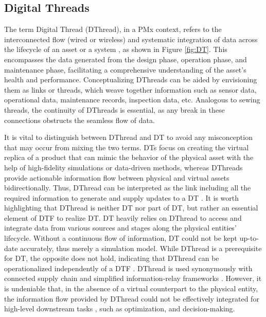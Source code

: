 \documentclass[runningheads]{llncs}
\begin{document}
\subsection{Digital Threads}
The term Digital Thread (DThread), in a PMx context, refers to the interconnected flow (wired or wireless) and systematic integration of data across the lifecycle of an asset or a system \cite{kunzer2022digital}, as shown in Figure \ref{fig:DT}. This encompasses the data generated from the design phase, operation phase, and maintenance phase, facilitating a comprehensive understanding of the asset's health and performance. Conceptualizing DThreads can be aided by envisioning them as links or threads, which weave together information such as sensor data, operational data, maintenance records, inspection data, etc. Analogous to sewing threads, the continuity of DThreads is essential, as any break in these connections obstructs the seamless flow of data.

It is vital to distinguish between DThread and DT to avoid any misconception that may occur from mixing the two terms. DTs focus on creating the virtual replica of a product that can mimic the behavior of the physical asset with the help of high-fidelity simulations or data-driven methods, whereas DThreads provide actionable information flow between physical and virtual assets bidirectionally. Thus, DThread can be interpreted as the link including all the required information to generate and supply updates to a DT \cite{singh2018engineering}. It is worth highlighting that DThread is neither DT nor part of DT, but rather an essential element of DTF to realize DT. DT heavily relies on DThread to access and integrate data from various sources and stages along the physical entities' lifecycle. Without a continuous flow of information, DT could not be kept up-to-date accurately, thus merely a simulation model. While DThread is a prerequisite for DT, the opposite does not hold, indicating that DThread can be operationalized independently of a DTF \cite{hedberg2020using}. DThread is used synonymously with connected supply chain \cite{kunzer2022digital} and simplified information-relay frameworks \cite{margaria2019digital}. However, it is undeniable that, in the absence of a virtual counterpart to the physical entity, the information flow provided by DThread could not be effectively integrated for high-level downstream tasks \cite{singh2021twin}, such as optimization, and decision-making.
\end{document}
